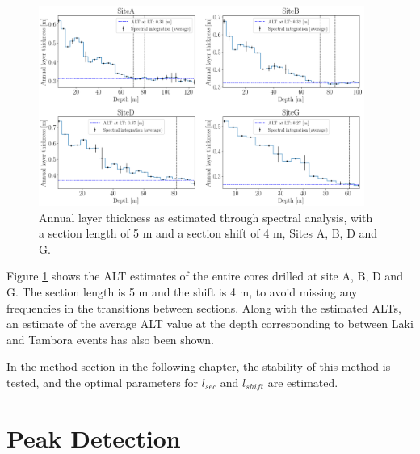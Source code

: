 \documentclass[../../CompleteThesis2/Complete_2ndDraft]{subfiles}
\begin{document}
\begin{figure}[h]
	\centering
	\includegraphics[width=0.95\textwidth]{AllCores_ALT_l5_s4.png}
	\caption[$\lambda$ profiles for sites A, B, D and G.]{\small Annual layer thickness as estimated through spectral analysis, with a section length of 5 m and a section shift of 4 m, Sites A, B, D and G.}
	\label{Fig:AllCores_ALT_l5_s4}
\end{figure}

Figure \ref{Fig:AllCores_ALT_l5_s4} shows the ALT estimates of the entire cores drilled at site A, B, D and G. The section length is 5 m and the shift is 4 m, to avoid missing any frequencies in the transitions between sections. Along with the estimated ALTs, an estimate of the average ALT value at the depth corresponding to between Laki and Tambora events has also been shown. 

In the method section in the following chapter, the stability of this method is tested, and the optimal parameters for $l_{sec}$ and $l_{shift}$ are estimated.


\section[Peak Detection]{Peak Detection}
\label{Sec:CompMeths_PeakDetection}
\end{document}
